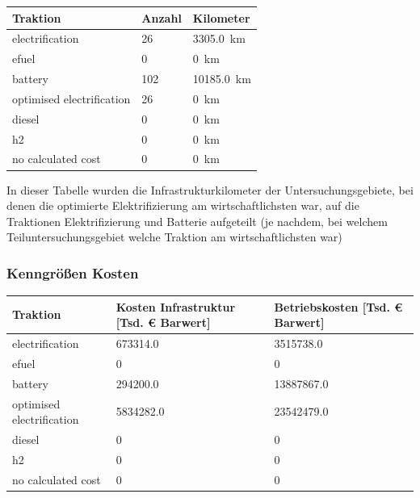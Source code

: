 \begin{center}
	\begin{tabularx}{\textwidth}{X | X | X} Traktion & Anzahl & Kilometer \\
	\hline
            electrification & \num{26} &  \SI{3305.0}{\km}\\
            efuel & \num{0} &  \SI{0}{\km}\\
            battery & \num{102} &  \SI{10185.0}{\km}\\
            optimised electrification & \num{26} &  \SI{0}{\km}\\
            diesel & \num{0} &  \SI{0}{\km}\\
            h2 & \num{0} &  \SI{0}{\km}\\
            no calculated cost & \num{0} &  \SI{0}{\km}\\
    	\end{tabularx}
\end{center}
In dieser Tabelle wurden die Infrastrukturkilometer der Untersuchungsgebiete, bei denen die optimierte Elektrifizierung am wirtschaftlichsten war, auf die Traktionen Elektrifizierung und Batterie aufgeteilt (je nachdem, bei welchem Teiluntersuchungsgebiet welche Traktion am wirtschaftlichsten war)

\subsubsection{Kenngrößen Kosten}

\begin{center}
	\begin{tabularx}{\textwidth}{X | X | X} Traktion & Kosten Infrastruktur [Tsd. € Barwert] & Betriebskosten [Tsd. € Barwert]\\
	\hline
            electrification & \num{673314.0} &  \num{3515738.0}\\
            efuel & \num{0} &  \num{0}\\
            battery & \num{294200.0} &  \num{13887867.0}\\
            optimised electrification & \num{5834282.0} &  \num{23542479.0}\\
            diesel & \num{0} &  \num{0}\\
            h2 & \num{0} &  \num{0}\\
            no calculated cost & \num{0} &  \num{0}\\
    	\end{tabularx}
\end{center}

